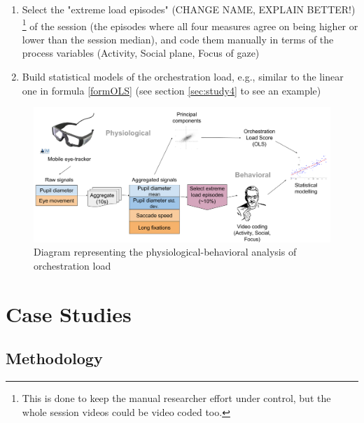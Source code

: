 \documentclass[10pt,journal,compsoc]{IEEEtran}
\begin{document}
\begin{itemize}
\begin{enumerate}
\item Select the "extreme load episodes" (CHANGE NAME, EXPLAIN BETTER!) \footnote{This is done to keep the manual researcher effort under control, but the whole session videos could be video coded too.} of the session (the episodes where all four measures agree on being higher or lower than the session median), and code them manually in terms of the process variables (Activity, Social plane, Focus of gaze)
\item Build statistical models of the orchestration load, e.g.,  similar to the linear one in formula \ref{formOLS} (see section \ref{sec:study4} to see an example)
\end{enumerate}
\end{itemize}



\begin{figure}[!t]
\centering
\includegraphics[width=\linewidth]{img/AnalysisMethodBase.png}
\caption{Diagram representing the physiological-behavioral analysis of orchestration load}
\label{fig:analysis}
\end{figure}

\section{Case Studies}
\label{sec:eval}

\subsection{Methodology}
\end{document}
